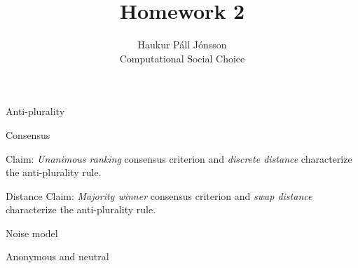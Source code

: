 \documentclass[12pt]{article}
\newenvironment{question}[2][Question]{\begin{trivlist}
\item[\hskip \labelsep {\bfseries #1}\hskip \labelsep {\bfseries #2.}]}{\end{trivlist}}
\newenvironment{answer}[2][Answer]{\begin{trivlist}
\item[\hskip \labelsep {\bfseries #1}\hskip \labelsep {\bfseries #2:}]}{\end{trivlist}}
\begin{document}
\renewcommand{\theenumi}{\roman{enumi}}

\let\oldsum\sum
\renewcommand{\sum}[3]{\oldsum\limits_{#1}^{#2}#3}
\let\oldprod\prod
\renewcommand{\prod}[3]{\oldprod\limits_{#1}^{#2}#3}

\newcommand\Dunion{
  \mathop{\mathchoice
    {\ooalign{$\displaystyle\bigcup$\cr\hss\scalebox{.65}{\raisebox{0.45ex}{\sffamily +}}\hss}}
    {\ooalign{$\textstyle\bigcup$\cr\hss\scalebox{.9}{\raisebox{0.5ex}{\tiny\sffamily +}}\hss}}
    {\ooalign{$\scriptstyle\bigcup$\cr\hss\scalebox{.45}{\raisebox{0.3ex}{\sffamily +}}\hss}}
    {\ooalign{$\scriptscriptstyle\bigcup$\cr\hss\scalebox{.38}{\raisebox{0.3ex}{\sffamily +}}\hss}}
    }
}

\title{Homework 2}
\author{Haukur Páll Jónsson\\
Computational Social Choice}

\maketitle

\begin{question}{1}{Anti-plurality}


\end{question}

\begin{answer}{a)}{Consensus}

Claim: \textit{Unanimous ranking} consensus criterion and \textit{discrete distance} characterize the anti-plurality rule.


\end{answer}

\begin{answer}{b)}{Distance}
Claim: \textit{Majority winner} consensus criterion and \textit{swap distance} characterize the anti-plurality rule.

\end{answer}

\begin{answer}{c)}{Noise model}


\end{answer}

\begin{question}{2}{Anonymous and neutral}

\end{question}
\end{document}
